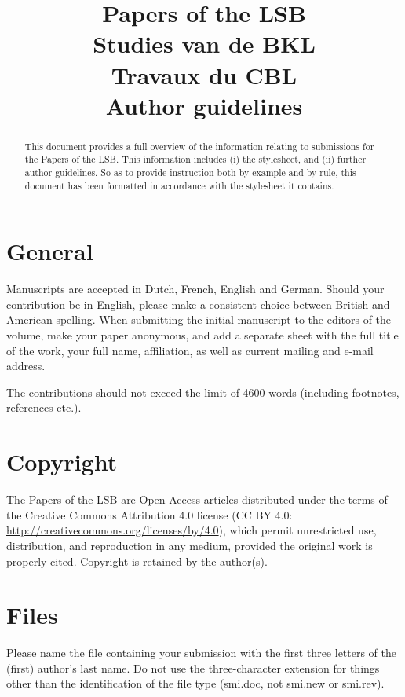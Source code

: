 \documentclass[times,linguex]{lsb}
\title[short title]{Papers of the LSB\\ 
Studies van de BKL\\
Travaux du CBL\\
\Large Author guidelines}
\author[Guido Vanden Wyngaerd]%
{
\spauthor{Guido Vanden Wyngaerd \\ 
\institute{KU Leuven}} 
}
\begin{document}
\maketitle

\begin{abstract} \normalsize  This document provides a full overview of the information relating to submissions for the Papers of the LSB. This information includes (i) the stylesheet, and (ii) further author guidelines. So as to provide instruction both by example and by rule, this document has been formatted in accordance with the stylesheet it contains.
\end{abstract}

\clearpage

\section{General}

Manuscripts are accepted in Dutch, French, English and German. Should your contribution be in English, please make a consistent choice between British and American spelling. When submitting the initial manuscript to the editors of the volume, make your paper anonymous, and  add a separate sheet with the full title of the work, your full name, affiliation, as well as current mailing and e-mail address.

The contributions should not exceed the limit of 4600 words (including footnotes, references etc.). 

\section{Copyright}

The Papers of the LSB are Open Access articles distributed under the terms of the Creative Commons Attribution 4.0 license (CC BY 4.0: \url{http://creativecommons.org/licenses/by/4.0}), which permit unrestricted use, distribution, and reproduction in any medium, provided the original work is properly cited. Copyright is retained by the author(s).

\section{Files}

Please name the file containing your submission with the first three letters of the (first) author’s last name. Do not use the three-character extension for things other than the identification of the file type (smi.doc, not smi.new or smi.rev). 
\end{document}
